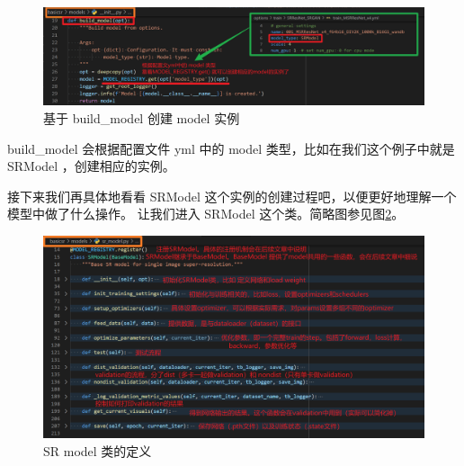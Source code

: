 \documentclass[../main.tex]{subfiles}
\begin{document}
\begin{enumerate}
          \begin{figure}[h]
              \begin{center}
                  \vspace{-0.2cm}
                  \includegraphics[width=0.85\linewidth]{figures/getting_start_build_model.png}
                  \vspace{-0.3cm}
                  \caption{基于 build\_model 创建 model 实例}
                  \label{fig:getting_start_build_model}
              \end{center}
              \vspace{-0.5cm}
          \end{figure}

          build\_model 会根据配置文件 yml 中的 model 类型，比如在我们这个例子中就是 SRModel ，创建相应的实例。

          接下来我们再具体地看看 SRModel 这个实例的创建过程吧，以便更好地理解一个模型中做了什么操作。
          让我们进入 SRModel 这个类。简略图参见图\ref{fig:getting_start_srmodel}。

          \begin{figure}[h]
              \begin{center}
                  \vspace{-0.2cm}
                  \includegraphics[width=0.85\linewidth]{figures/getting_start_srmodel.png}
                  \vspace{-0.3cm}
                  \caption{SR model 类的定义}
                  \label{fig:getting_start_srmodel}
              \end{center}
              \vspace{-0.5cm}
          \end{figure}


\end{enumerate}
\end{document}
